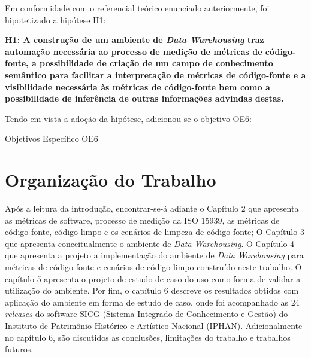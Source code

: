 Em conformidade com o referencial teórico enunciado anteriormente, foi hipotetizado a hipótese H1:

\textbf{H1: A construção de um ambiente de \textit{Data Warehousing} traz automação necessária ao processo de medição de métricas de código-fonte, a possibilidade de criação de um campo de conhecimento semântico para facilitar a interpretação de métricas de código-fonte e a visibilidade necessária às métricas de código-fonte bem como a possibilidade de inferência de outras informações advindas destas.} 

Tendo em vista a adoção da hipótese, adicionou-se o objetivo OE6:
\begin{table}[H]
\centering

\caption{Objetivos Específico OE6}
\label{tbl:obj} 
\end{table}
\FloatBarrier


\section{Organização do Trabalho}

Após a leitura da introdução, encontrar-se-á adiante o Capítulo 2 que apresenta as 
métricas de software, processo de medição da ISO 15939, 
as métricas de código-fonte, código-limpo e os cenários de limpeza de código-fonte; O Capítulo 3 que apresenta conceitualmente o ambiente de \textit{Data Warehousing}. O Capítulo 4 que apresenta a projeto  a implementação do ambiente de \textit{Data Warehousing} para métricas de código-fonte e cenários de código limpo construído neste trabalho. O capítulo 5 apresenta o projeto de estudo de caso do uso como forma de validar a utilização do ambiente. Por fim, o capítulo 6 descreve os resultados obtidos com aplicação do ambiente em forma de estudo de caso, onde foi acompanhado as 24 \textit{releases} do software SICG (Sistema Integrado de Conhecimento e Gestão) do Instituto de Patrimônio Histórico e Artístico Nacional (IPHAN). Adicionalmente no capítulo 6, são discutidos as conclusões, limitações do trabalho e trabalhos futuros.   